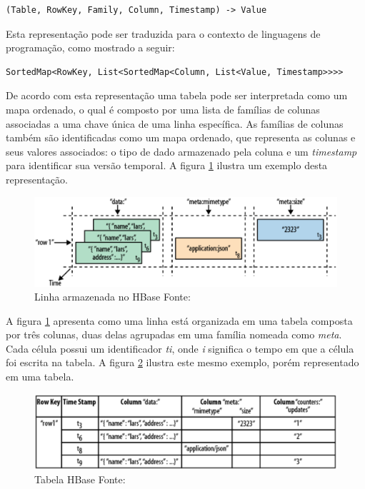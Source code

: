 \begin{lstlisting}[style=abnt,frame=none]
(Table, RowKey, Family, Column, Timestamp) -> Value
\end{lstlisting}

Esta representação pode ser traduzida para o contexto de linguagens de programação, como mostrado a seguir:

\begin{lstlisting}[style=abnt,frame=none]
SortedMap<RowKey, List<SortedMap<Column, List<Value, Timestamp>>>>
\end{lstlisting}

De acordo com esta representação uma tabela pode ser interpretada como um mapa ordenado, o qual é composto por uma lista de famílias de colunas associadas a uma chave única de uma linha específica. As famílias de colunas também são identificadas como um mapa ordenado, que representa as colunas e seus valores associados: o tipo de dado armazenado pela coluna e um \textit{timestamp} para identificar sua versão temporal. A figura \ref{fig-hbase-row} ilustra um exemplo desta representação. 

\begin{figure}[ht!]
	\centering
	\includegraphics[keepaspectratio=true,scale=0.4]
	  {figuras/hbase-row.eps}
	\caption[Linha armazenada no HBase]{Linha armazenada no HBase
	\protect\linebreak Fonte: \cite{george2011}}
	\label{fig-hbase-row}
\end{figure}
\FloatBarrier

A figura \ref{fig-hbase-row} apresenta como uma linha está organizada em uma tabela composta por três colunas, duas delas agrupadas em uma família nomeada como \textit{meta}. Cada célula possui um identificador \textit{ti}, onde \textit{i} significa o tempo em que a célula foi escrita na tabela. A figura \ref{fig-hbase-table} ilustra este mesmo exemplo, porém representado em uma tabela.

\begin{figure}[ht!]
	\centering
	\includegraphics[keepaspectratio=true,scale=0.4]
	  {figuras/hbase-table.eps}
	\caption[Tabela HBase]{Tabela HBase
	\protect\linebreak Fonte: \cite{george2011}}
	\label{fig-hbase-table}
\end{figure}
\FloatBarrier

